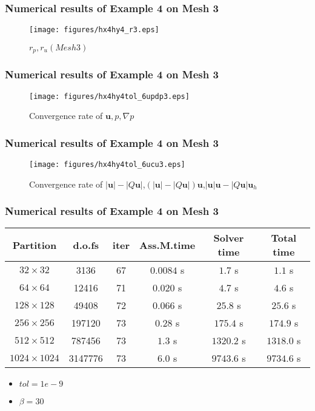 \documentclass[notheorems,serif]{beamer}
\begin{document}
\begin{frame}
\frametitle{Numerical results of Example 4 on Mesh 3}
\begin{figure}[H] 
\centering 
\texttt{[image: figures/hx4hy4\_r3.eps]} 
\caption{$r_p, r_u(Mesh 3)$}
\label{fig:rpmesh3p4}
\end{figure}
\end{frame}

\begin{frame}
\frametitle{Numerical results of Example 4 on Mesh 3}
\begin{figure}[H] 
\centering 
\texttt{[image: figures/hx4hy4tol\_6updp3.eps]} 
\caption{Convergence rate of $\boldsymbol{u}, p, \nabla p$}
\label{fig:upmesh3p4} 
\end{figure}
\end{frame}

\begin{frame}
\frametitle{Numerical results of Example 4 on Mesh 3}
\begin{figure}[H] 
\centering 
\texttt{[image: figures/hx4hy4tol\_6ucu3.eps]} 
\caption{Convergence rate of $\left|\boldsymbol{u}\right|-\left|Q\boldsymbol{u}\right|$,$(\left|\boldsymbol{u}\right|-\left|Q\boldsymbol{u}\right|)\boldsymbol{u}$,$\left|\boldsymbol{u}\right|\boldsymbol{u}-\left|Q\boldsymbol{u}\right|\boldsymbol{u}_h$}
\label{fig:normumesh3p4} 
\end{figure}
\end{frame}

\begin{frame}
\frametitle{Numerical results of Example 4 on Mesh 3}
\begin{tabular}{ |c|c|c|c|c|c| }   
\hline   
Partition & d.o.fs & iter & Ass.M.time & Solver time & Total time \\
\hline
$32\times 32$ & 3136 & 67 & $0.0084$ s & $1.7$ s & $1.1$ s \\
$64\times 64$ & 12416 & 71 & $0.020$ s & $4.7$ s & $4.6$ s \\
$128\times 128$ & 49408 & 72 & $0.066$ s & $25.8$ s & $25.6$ s \\
$256\times 256$ & 197120 & 73 & $0.28$ s & $175.4$ s & $174.9$ s \\
$512\times 512$ & 787456 & 73 & $1.3$ s & $1320.2$ s & $1318.0$ s \\
$1024\times 1024$ & 3147776 & 73 & $6.0$ s & $9743.6$ s & $9734.6$ s \\
\hline 
\end{tabular}
\smallskip
\begin{itemize}
\item $tol = 1e-9$
\item $\beta = 30$
\end{itemize}
\end{frame}
\end{document}
